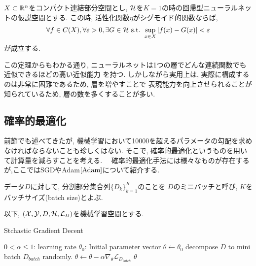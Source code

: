 \begin{Thm}[普遍性定理]
    $X\subset\mathbb{R}^n$をコンパクト連結部分空間とし, $\mathcal{H}$を$K = 1$の時の回帰型ニューラルネットの仮説空間とする. 
    この時, 活性化関数$\eta$がシグモイド的関数ならば, 
    \begin{align*}
        \forall f\in C(X), \forall\varepsilon> 0, \exists G\in\mathcal{H}\text{ s.t. } \sup_{x\in X}|f(x) - G(x)| < \varepsilon
    \end{align*}
    が成立する. 
\end{Thm}
この定理からもわかる通り, ニューラルネットは1つの層でどんな連続関数でも近似できるほどの高い近似能力
を持つ. しかしながら実用上は, 実際に構成するのは非常に困難であるため, 層を増やすことで
表現能力を向上させられることが知られているため, 層の数を多くすることが多い.
\subsection{確率的最適化}
前節でも述べてきたが, 機械学習において10000を超えるパラメータの勾配を求めなければならないことも珍しくはない.
そこで, 確率的最適化というものを用いて計算量を減らすことを考える.　
確率的最適化手法には様々なものが存在するが,ここではSGDやAdam$\cite{Adam}$について紹介する.
\begin{Defi}[ミニバッチ]
    データ$D$に対して, 分割部分集合列$\{D_{k}\}_{k = 1}^{K}$のことを
    $D$のミニバッチと呼び, $K$をバッチサイズ(batch size)とよぶ. 
\end{Defi}
以下, $(\mathcal{X}, \mathcal{Y}, D, \mathcal{H}, \mathcal{L}_{D})$を機械学習空間とする. 
\begin{algorithm}[H]
    \caption{Stchastic Gradient Decent}
    \begin{algorithmic}
        \REQUIRE $0 < \alpha\leq 1$: learning rate
        \REQUIRE $\theta_{0}$: Initial parameter vector
        \STATE $\theta\leftarrow\theta_{0}$
        \STATE decompose $D$ to mini batch $D_{batch}$ randomly.
        \STATE $\theta\leftarrow\theta - \alpha\nabla_{\theta}\mathcal{L}_{D_{batch}}$
        \ENDFOR
        \ENDWHILE
        \RETURN $\theta$
    \end{algorithmic}
\end{algorithm}
